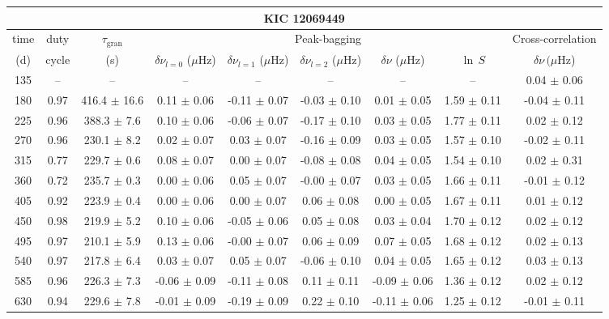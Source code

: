 \documentclass[twocolumn]{aastex61}%
\begin{document}
\begin{table*}[ht]\centering\fontsize{9.}{7.}\selectfont
\begin{tabular}{ccc|ccccc|c}
\multicolumn{9}{c}{KIC 12069449}\\ \hline\hline
time & duty & $\tau_\text{gran}$ &\multicolumn{5}{c|}{Peak-bagging}&Cross-correlation\\
(d)& cycle & (s)&$\delta\nu_{l=0}$ ($\mu$Hz) & $\delta\nu_{l=1}$ ($\mu$Hz) & $\delta\nu_{l=2}$ ($\mu$Hz) & $\delta\nu$ ($\mu$Hz)& $\ln\,S$ & $\delta\nu\,(\mu$Hz)\\\hline
135 & -- & -- & -- & -- & -- & -- & -- & 0.04 $\pm$ 0.06\\
180 & 0.97 & 416.4 $\pm$ 16.6 & 0.11 $\pm$ 0.06 & -0.11 $\pm$ 0.07 & -0.03 $\pm$ 0.10 & 0.01 $\pm$ 0.05 & 1.59 $\pm$ 0.11 & -0.04 $\pm$ 0.11\\
225 & 0.96 & 388.3 $\pm$ 7.6 & 0.10 $\pm$ 0.06 & -0.06 $\pm$ 0.07 & -0.17 $\pm$ 0.10 & 0.03 $\pm$ 0.05 & 1.77 $\pm$ 0.11 & 0.02 $\pm$ 0.12\\
270 & 0.96 & 230.1 $\pm$ 8.2 & 0.02 $\pm$ 0.07 & 0.03 $\pm$ 0.07 & -0.16 $\pm$ 0.09 & 0.03 $\pm$ 0.05 & 1.57 $\pm$ 0.10 & -0.02 $\pm$ 0.11\\
315 & 0.77 & 229.7 $\pm$ 0.6 & 0.08 $\pm$ 0.07 & 0.00 $\pm$ 0.07 & -0.08 $\pm$ 0.08 & 0.04 $\pm$ 0.05 & 1.54 $\pm$ 0.10 & 0.02 $\pm$ 0.31\\
360 & 0.72 & 235.7 $\pm$ 0.3 & 0.00 $\pm$ 0.06 & 0.05 $\pm$ 0.07 & -0.00 $\pm$ 0.07 & 0.03 $\pm$ 0.05 & 1.66 $\pm$ 0.11 & -0.01 $\pm$ 0.12\\
405 & 0.92 & 223.9 $\pm$ 0.4 & 0.00 $\pm$ 0.06 & 0.00 $\pm$ 0.07 & 0.06 $\pm$ 0.08 & 0.00 $\pm$ 0.05 & 1.67 $\pm$ 0.11 & 0.01 $\pm$ 0.12\\
450 & 0.98 & 219.9 $\pm$ 5.2 & 0.10 $\pm$ 0.06 & -0.05 $\pm$ 0.06 & 0.05 $\pm$ 0.08 & 0.03 $\pm$ 0.04 & 1.70 $\pm$ 0.12 & 0.02 $\pm$ 0.12\\
495 & 0.97 & 210.1 $\pm$ 5.9 & 0.13 $\pm$ 0.06 & -0.00 $\pm$ 0.07 & 0.06 $\pm$ 0.09 & 0.07 $\pm$ 0.05 & 1.68 $\pm$ 0.12 & 0.02 $\pm$ 0.13\\
540 & 0.97 & 217.8 $\pm$ 6.4 & 0.03 $\pm$ 0.07 & 0.05 $\pm$ 0.07 & -0.06 $\pm$ 0.10 & 0.04 $\pm$ 0.05 & 1.65 $\pm$ 0.12 & 0.03 $\pm$ 0.13\\
585 & 0.96 & 226.3 $\pm$ 7.3 & -0.06 $\pm$ 0.09 & -0.11 $\pm$ 0.08 & 0.11 $\pm$ 0.11 & -0.09 $\pm$ 0.06 & 1.36 $\pm$ 0.12 & 0.02 $\pm$ 0.12\\
630 & 0.94 & 229.6 $\pm$ 7.8 & -0.01 $\pm$ 0.09 & -0.19 $\pm$ 0.09 & 0.22 $\pm$ 0.10 & -0.11 $\pm$ 0.06 & 1.25 $\pm$ 0.12 & -0.01 $\pm$ 0.11\\

\end{tabular}
\end{table*}
\end{document}
